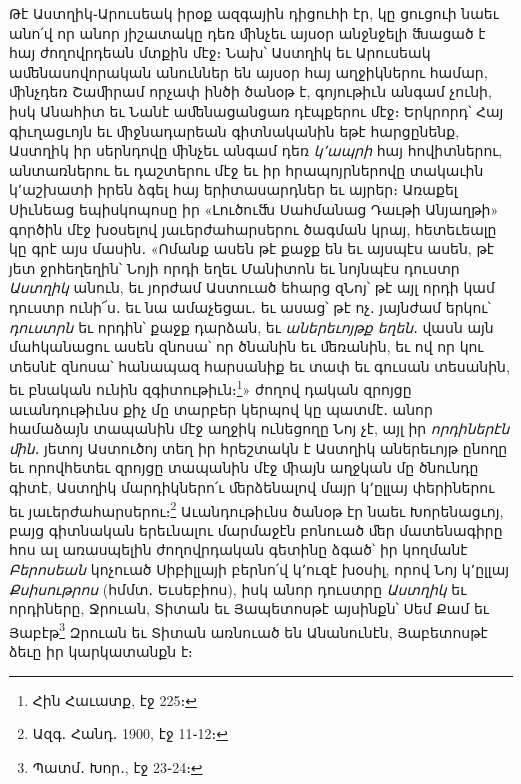 \documentclass{article}
\begin{document}
{Թէ Աստղիկ֊Արուսեակ իրօք ազգային դիցուհի էր, կը ցուցուի նաեւ անո՛վ որ անոր յիշատակը դեռ ﬕնչեւ այսօր անջնջելի ﬓացած է հայ ժողովրդեան մտքին մէջ։ Նախ՝ Աստղիկ եւ Արուսեակ աﬔնասովորական անուններ են այսօր հայ աղջիկներու համար, ﬕնչդեռ Շաﬕրամ որչափ ինծի ծանօթ է, գոյութիւն անգամ չունի, իսկ Անահիտ եւ Նանէ աﬔնացանցառ դէպքերու մէջ։ Երկրորդ՝ Հայ գիւղացւոյն եւ ﬕջնադարեան գիտնականին եթէ հարցընենք, Աստղիկ իր սերնդովը ﬕնչեւ անգամ դեռ \emph{կ՚ապրի} հայ հովիտներու, անտառներու եւ դաշտերու մէջ եւ իր հրապոյրներովը տակաւին կ՚աշխատի իրեն ձգել հայ երիտասարդներ եւ այրեր։ Առաքել Սիւնեաց եպիսկոպոսը իր «Լուծուﬓ Սահմանաց Դաւթի Անյաղթի» գործին մէջ խօսելով յաւերժահարսերու ծագման կրայ, հետեւեալը կը գրէ այս մասին․ «Ոմանք ասեն թէ քաջք են եւ այսպէս ասեն, թէ յետ ջրհեղեղին՝ Նոյի որդի եղեւ Մանիտոն եւ նոյնպէս դուստր \emph{Աստղիկ} անուն, եւ յորժամ Աստուած եհարց զՆոյ՝ թէ այլ որդի կամ դուստր ունի՜ս․ եւ նա ամաչեցաւ․ եւ ասաց՝ թէ ոչ․ յայնժամ երկու՝ \emph{դուստրն} եւ որդին՝ քաջք դարձան, եւ \emph{աներեւոյթք եղեն}․ վասն այն մահկանացու ասեն զնոսա՝ որ ծնանին եւ ﬔռանին, եւ ով որ կու տեսնէ զնոսա՝ հանապազ հարսանիք եւ տափ եւ գուսան տեսանին, եւ բնական ունին զգիտութիւն։\footnote{Հին Հաւատք, էջ 225։}» ժողով դական զրոյցը աւանդութիւնս քիչ մը տարբեր կերպով կը պատմէ․ անոր համաձայն տապանին մէջ աղջիկ ունեցողը Նոյ չէ, այլ իր \emph{որդիներէն ﬕն}․ յետոյ Աստուծոյ տեղ իր հրեշտակն է Աստղիկ աներեւոյթ ընողը եւ որովհետեւ զրոյցը տապանին մէջ ﬕայն աղջկան մը ծնունդը գիտէ, Աստղիկ մարդիկներո՛ւ ﬔրձենալով մայր կ՚ըլլայ փերիներու եւ յաւերժահարսերու։\footnote{Ազգ․ Հանդ․ 1900, էջ 11֊12։} Աւանդութիւնս ծանօթ էր նաեւ Խորենացւոյ, բայց գիտնական երեւնալու մարմաջէն բոնուած ﬔր մատենագիրը հոս ալ առասպելին ժողովրդական գետինը ձգած՝ իր կողմանէ \emph{Բերոսեան} կոչուած Սիբիլլայի բերնո՛վ կ՚ուզէ խօսիլ, որով Նոյ կ՚ըլլայ \emph{Քսիսութրոս} (հմմտ․ Եւսեբիոս), իսկ անոր դուստրը \emph{Աստղիկ} եւ որդիները, Ջրուան, Տիտան եւ Յապետոսթէ այսինքն՝ Սեմ Քամ եւ Յաբէթ\footnote{Պատմ․ Խոր․, էջ 23֊24։} Զրուան եւ Տիտան առնուած են Անանունէն, Յաբետոսթէ ձեւը իր կարկատանքն է։

}
\end{document}
